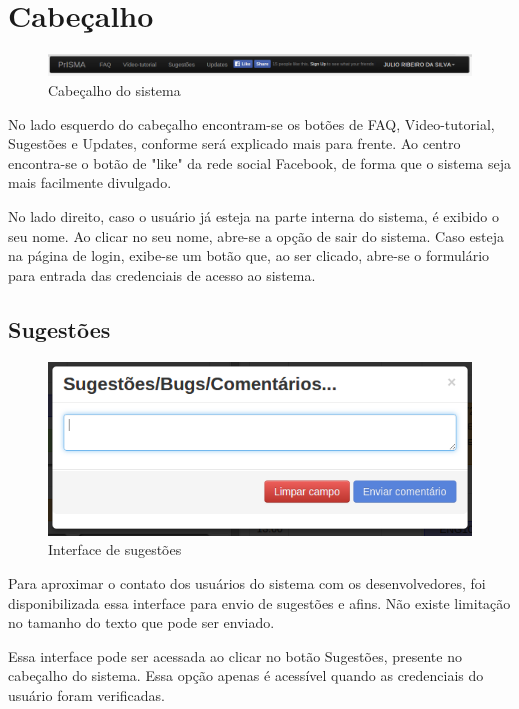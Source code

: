 \documentclass[graduacao,brazil]{ThesisPUC}
\begin{document}
\section{Cabeçalho}

\begin{figure}[H]
    \centering
    \includegraphics[width=\linewidth]{img/v3_header.png}
    \caption{Cabeçalho do sistema}
\end{figure}

No lado esquerdo do cabeçalho encontram-se os botões de FAQ, Video-tutorial, Sugestões e Updates, conforme será explicado mais para frente. Ao centro encontra-se o botão de "like" da rede social Facebook, de forma que o sistema seja mais facilmente divulgado. 

No lado direito, caso o usuário já esteja na parte interna do sistema, é exibido o seu nome. Ao clicar no seu nome, abre-se a opção de sair do sistema. Caso esteja na página de login, exibe-se um botão que, ao ser clicado, abre-se o formulário para entrada das credenciais de acesso ao sistema.

\subsection{Sugestões}

\begin{figure}[H]
    \centering
    \includegraphics[width=0.7\linewidth]{img/v3_sugestoes.png}
    \caption{Interface de sugestões}
\end{figure}

Para aproximar o contato dos usuários do sistema com os desenvolvedores, foi disponibilizada essa interface para envio de sugestões e afins. Não existe limitação no tamanho do texto que pode ser enviado. 

Essa interface pode ser acessada ao clicar no botão Sugestões, presente no cabeçalho do sistema. Essa opção apenas é acessível quando as credenciais do usuário foram verificadas.
\end{document}
